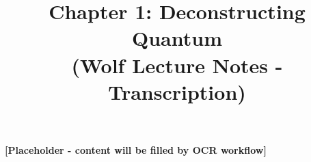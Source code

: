 \documentclass{article}
\title{Chapter 1: Deconstructing Quantum \\ {\small (Wolf Lecture Notes - Transcription)}}
\date{}
\begin{document}
\maketitle
\tableofcontents

\textbf{[Placeholder - content will be filled by OCR workflow]}
\end{document}
